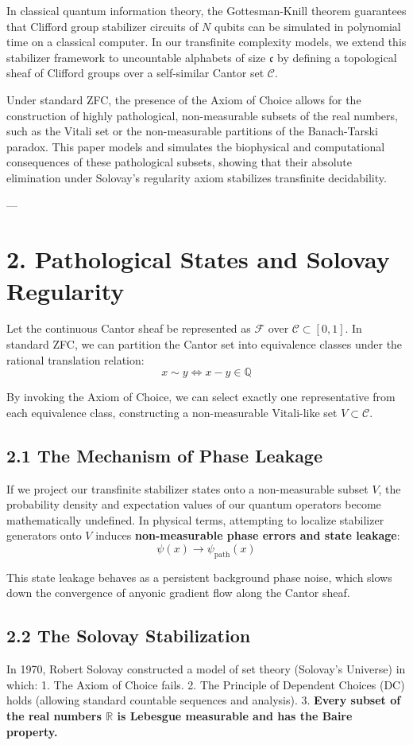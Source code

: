 \documentclass[11pt,twocolumn]{article}
\begin{document}
In classical quantum information theory, the Gottesman-Knill theorem guarantees that Clifford group stabilizer circuits of $N$ qubits can be simulated in polynomial time on a classical computer. In our transfinite complexity models, we extend this stabilizer framework to uncountable alphabets of size $\mathfrak{c}$ by defining a topological sheaf of Clifford groups over a self-similar Cantor set $\mathcal{C}$.

Under standard ZFC, the presence of the Axiom of Choice allows for the construction of highly pathological, non-measurable subsets of the real numbers, such as the Vitali set or the non-measurable partitions of the Banach-Tarski paradox. This paper models and simulates the biophysical and computational consequences of these pathological subsets, showing that their absolute elimination under Solovay's regularity axiom stabilizes transfinite decidability.

---

\section{2. Pathological States and Solovay Regularity}
Let the continuous Cantor sheaf be represented as $\mathcal{F}$ over $\mathcal{C} \subset [0, 1]$. In standard ZFC, we can partition the Cantor set into equivalence classes under the rational translation relation:
$$x \sim y \iff x - y \in \mathbb{Q}$$

By invoking the Axiom of Choice, we can select exactly one representative from each equivalence class, constructing a non-measurable Vitali-like set $V \subset \mathcal{C}$. 

\subsection{2.1 The Mechanism of Phase Leakage}
If we project our transfinite stabilizer states onto a non-measurable subset $V$, the probability density and expectation values of our quantum operators become mathematically undefined. In physical terms, attempting to localize stabilizer generators onto $V$ induces \textbf{non-measurable phase errors and state leakage}:
$$\psi(x) \to \psi_{\text{path}}(x)$$

This state leakage behaves as a persistent background phase noise, which slows down the convergence of anyonic gradient flow along the Cantor sheaf.

\subsection{2.2 The Solovay Stabilization}
In 1970, Robert Solovay constructed a model of set theory (Solovay's Universe) in which:
1.  The Axiom of Choice fails.
2.  The Principle of Dependent Choices (DC) holds (allowing standard countable sequences and analysis).
3.  \textbf{Every subset of the real numbers $\mathbb{R}$ is Lebesgue measurable and has the Baire property.}
\end{document}
